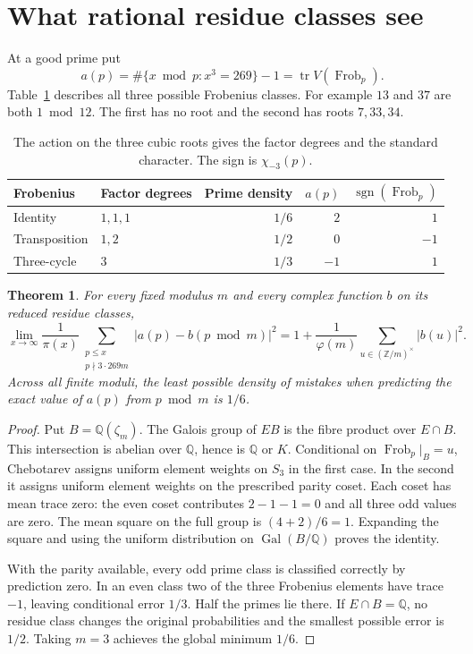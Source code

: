 \documentclass[11pt]{article}
\newtheorem{theorem}{Theorem}
\newcommand{\Q}{\mathbb Q}
\newcommand{\Gal}{\operatorname{Gal}}
\newcommand{\Frob}{\operatorname{Frob}}
\newcommand{\Tr}{\operatorname{tr}}
\newcommand{\sgn}{\operatorname{sgn}}
\begin{document}
\section{What rational residue classes see}
At a good prime put
\[
 a(p)=\#\{x\bmod p:x^3=269\}-1=\Tr V(\Frob_p).
\]
Table~\ref{tab:classes} describes all three possible Frobenius classes.
For example \(13\) and \(37\) are both \(1\bmod12\). The first has no
root and the second has roots \(7,33,34\).

\begin{table}[ht]
\centering
\begin{tabular}{llrrr}
\toprule
Frobenius & Factor degrees & Prime density & \(a(p)\) & \(\sgn(\Frob_p)\)\\
\midrule
Identity & \(1,1,1\) & \(1/6\)& \(2\)&\(1\)\\
Transposition & \(1,2\)& \(1/2\)& \(0\)&\(-1\)\\
Three-cycle & \(3\)& \(1/3\)& \(-1\)&\(1\)\\
\bottomrule
\end{tabular}
\caption{The action on the three cubic roots gives the factor degrees and
the standard character. The sign is \(\chi_{-3}(p)\).}\label{tab:classes}
\end{table}

\begin{theorem}\label{thm:residues}
For every fixed modulus \(m\) and every complex function \(b\) on its
reduced residue classes,
\[
 \lim_{x\to\infty}\frac1{\pi(x)}
   \sum_{\substack{p\le x\\p\nmid 3\cdot269m}}
   |a(p)-b(p\bmod m)|^2
 =1+\frac1{\varphi(m)}\sum_{u\in(\mathbb Z/m)^\times}|b(u)|^2.
\]
Across all finite moduli, the least possible density of mistakes when
predicting the exact value of \(a(p)\) from \(p\bmod m\) is \(1/6\).
\end{theorem}
\begin{proof}
Put \(B=\Q(\zeta_m)\). The Galois group of \(EB\) is the fibre product
over \(E\cap B\). This intersection is abelian over \(\Q\), hence is
\(\Q\) or \(K\). Conditional on \(\Frob_p|_B=u\), Chebotarev assigns
uniform element weights on \(S_3\) in the first case. In the second it
assigns uniform element weights on the prescribed parity coset. Each coset
has mean trace zero: the even coset contributes \(2-1-1=0\) and all
three odd values are zero. The mean square on the full group is
\((4+2)/6=1\). Expanding the square and using the uniform distribution
on \(\Gal(B/\Q)\) proves the identity.

With the parity available, every odd prime class is classified correctly
by prediction zero. In an even class two of the three Frobenius elements
have trace \(-1\), leaving conditional error \(1/3\). Half the primes
lie there. If \(E\cap B=\Q\), no residue class changes the original
probabilities and the smallest possible error is \(1/2\). Taking
\(m=3\) achieves the global minimum \(1/6\).
\end{proof}
\end{document}
